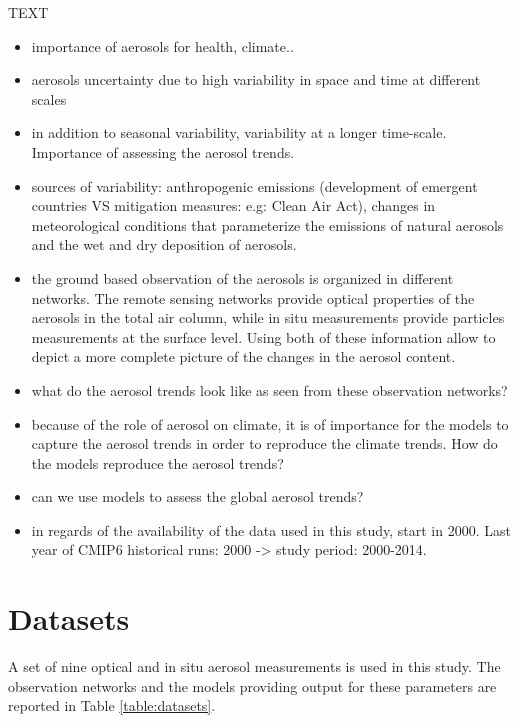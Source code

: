 \documentclass[journal abbreviation, manuscript]{copernicus}
\begin{document}
\introduction  %
TEXT
\begin{itemize}
 \item importance of aerosols for health, climate..
 \item aerosols uncertainty due to high variability in space and time at different scales
 \item in addition to seasonal variability, variability at a longer time-scale. Importance of assessing the aerosol trends.
 \item sources of variability: anthropogenic emissions (development of emergent countries VS mitigation measures: e.g: Clean Air Act), changes in meteorological conditions that parameterize the emissions of natural aerosols and the wet and dry deposition of aerosols.
 \item the ground based observation of the aerosols is organized in different networks. The remote sensing networks provide optical properties of the aerosols in the total air column, while in situ measurements provide particles measurements at the surface level. Using both of these information allow to depict a more complete picture of the changes in the aerosol content.
 \item what do the aerosol trends look like as seen from these observation networks?
 \item because of the role of aerosol on climate, it is of importance for the models to capture the aerosol trends in order to reproduce the climate trends. How do the models reproduce the aerosol trends?
 \item can we use models to assess the global aerosol trends?
 \item in regards of the availability of the data used in this study, start in 2000. Last year of CMIP6 historical runs: 2000 -> study period: 2000-2014.
\end{itemize}


\section{Datasets}
A set of nine optical and in situ aerosol measurements is used in this study. The observation networks and the models providing output for these parameters are reported in Table \ref{table:datasets}.
\end{document}
